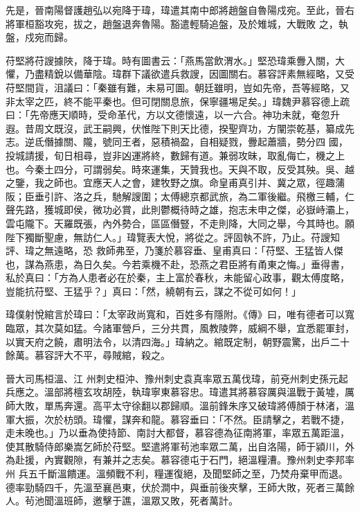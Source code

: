 \begin{pinyinscope}
 先是，晉南陽督護趙弘以宛降于瑋，瑋遣其南中郎將趙盤自魯陽戍宛。至此，晉右將軍桓豁攻宛，拔之，趙盤退奔魯陽。豁遣輕騎追盤，及於雉城，大戰敗
 之，執盤，戍宛而歸。



 苻堅將苻謏據陜，降于瑋。時有圖書云：「燕馬當飲渭水。」堅恐瑋乘釁入關，大懼，乃盡精銳以備華陰。瑋群下議欲遣兵救謏，因圖關右。慕容評素無經略，又受苻堅間貨，沮議曰：「秦雖有難，未易可圖。朝廷雖明，豈如先帝，吾等經略，又非太宰之匹，終不能平秦也。但可閉關息旅，保寧疆埸足矣。」瑋魏尹慕容德上疏曰：「先帝應天順時，受命革代，方以文德懷遠，以一六合。神功未就，奄忽升遐。昔周文既沒，武王嗣興，伏惟陛下則天比德，揆聖齊功，方闡崇乾基，纂成先志。逆氐僭據關、隴，號同王者，惡積禍盈，自相疑戮，釁起蕭牆，勢分四
 國，投城請援，旬日相尋，豈非凶運將終，數歸有道。兼弱攻昧，取亂侮亡，機之上也。今秦土四分，可謂弱矣。時來運集，天贊我也。天與不取，反受其殃。吳、越之鑒，我之師也。宜應天人之會，建牧野之旗。命皇甫真引并、冀之眾，徑趣蒲阪；臣垂引許、洛之兵，馳解謏圍；太傅總京都武旅，為二軍後繼。飛檄三輔，仁聲先路，獲城即侯，微功必賞，此則鬱概待時之雄，抱志未申之傑，必嶽峙灞上，雲屯隴下。天羅既張，內外勢合，區區僭豎，不走則降，大同之舉，今其時也。願陛下獨斷聖慮，無訪仁人。」瑋覽表大悅，將從之。評固執不許，乃止。苻謏知評、瑋之無遠略，恐
 救師弗至，乃箋於慕容垂、皇甫真曰：「苻堅、王猛皆人傑也，謀為燕患，為日久矣。今若乘機不赴，恐燕之君臣將有甬東之悔。」垂得書，私於真曰：「方為人患者必在於秦，主上富於春秋，未能留心政事，觀太傅度略，豈能抗苻堅、王猛乎？」真曰：「然，繞朝有云，謀之不從可如何！」



 瑋僕射悅綰言於瑋曰：「太宰政尚寬和，百姓多有隱附。《傳》曰，唯有德者可以寬臨眾，其次莫如猛。今諸軍營戶，三分共貫，風教陵弊，威綱不舉，宜悉罷軍封，以實天府之饒，肅明法令，以清四海。」瑋納之。綰既定制，朝野震驚，出戶二十餘萬。慕容評大不平，尋賊綰，殺之。



 晉大司馬桓溫、江
 州刺史桓沖、豫州刺史袁真率眾五萬伐瑋，前兗州刺史孫元起兵應之。溫部將檀玄攻胡陸，執瑋寧東慕容忠。瑋遣其將慕容厲與溫戰于黃墟，厲師大敗，單馬奔還。高平太守徐翻以郡歸順。溫前鋒朱序又破瑋將傅顏于林渚，溫軍大振，次於枋頭。瑋懼，謀奔和龍。慕容垂曰：「不然。臣請擊之，若戰不捷，走未晚也。」乃以垂為使持節、南討大都督，慕容德為征南將軍，率眾五萬距溫，使其散騎侍郎樂嵩乞師於苻堅。堅遣將軍茍池率眾二萬，出自洛陽，師于潁川，外為赴援，內實觀隙，有兼并之志矣。慕容德屯于石門，絕溫糧漕。豫州刺史李邦率州
 兵五千斷溫饋運。溫頻戰不利，糧運復絕，及聞堅師之至，乃焚舟棄甲而退。德率勁騎四千，先溫至襄邑東，伏於澗中，與垂前後夾擊，王師大敗，死者三萬餘人。茍池聞溫班師，邀擊于譙，溫眾又敗，死者萬計。




\end{pinyinscope}
